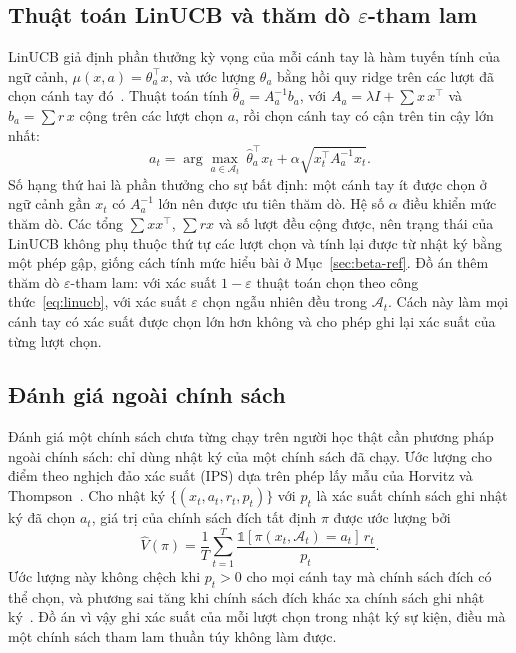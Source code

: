 \subsection{Thuật toán LinUCB và thăm dò $\varepsilon$-tham lam}
LinUCB giả định phần thưởng kỳ vọng của mỗi cánh tay là hàm tuyến tính của ngữ cảnh, $\mu(x,a)=\theta_a^{\top}x$, và ước lượng $\theta_a$ bằng hồi quy ridge trên các lượt đã chọn cánh tay đó~\cite{li2010linucb}. Thuật toán tính $\hat\theta_a=A_a^{-1}b_a$, với $A_a=\lambda I+\sum x\,x^{\top}$ và $b_a=\sum r\,x$ cộng trên các lượt chọn $a$, rồi chọn cánh tay có cận trên tin cậy lớn nhất:
\begin{equation}
a_t=\arg\max_{a\in\mathcal{A}_t}\ \hat\theta_a^{\top}x_t+\alpha\sqrt{x_t^{\top}A_a^{-1}x_t}.
\label{eq:linucb}
\end{equation}
Số hạng thứ hai là phần thưởng cho sự bất định: một cánh tay ít được chọn ở ngữ cảnh gần $x_t$ có $A_a^{-1}$ lớn nên được ưu tiên thăm dò. Hệ số $\alpha$ điều khiển mức thăm dò. Các tổng $\sum xx^{\top}$, $\sum rx$ và số lượt đều cộng được, nên trạng thái của LinUCB không phụ thuộc thứ tự các lượt chọn và tính lại được từ nhật ký bằng một phép gập, giống cách tính mức hiểu bài ở Mục~\ref{sec:beta-ref}. Đồ án thêm thăm dò $\varepsilon$-tham lam: với xác suất $1-\varepsilon$ thuật toán chọn theo công thức~\eqref{eq:linucb}, với xác suất $\varepsilon$ chọn ngẫu nhiên đều trong $\mathcal{A}_t$. Cách này làm mọi cánh tay có xác suất được chọn lớn hơn không và cho phép ghi lại xác suất của từng lượt chọn.

\subsection{Đánh giá ngoài chính sách}
Đánh giá một chính sách chưa từng chạy trên người học thật cần phương pháp ngoài chính sách: chỉ dùng nhật ký của một chính sách đã chạy. Ước lượng cho điểm theo nghịch đảo xác suất (IPS) dựa trên phép lấy mẫu của Horvitz và Thompson~\cite{horvitz1952}. Cho nhật ký $\{(x_t,a_t,r_t,p_t)\}$ với $p_t$ là xác suất chính sách ghi nhật ký đã chọn $a_t$, giá trị của chính sách đích tất định $\pi$ được ước lượng bởi
\begin{equation}
\hat V(\pi)=\frac{1}{T}\sum_{t=1}^{T}\frac{\mathbb{1}[\pi(x_t,\mathcal{A}_t)=a_t]\,r_t}{p_t}.
\label{eq:ips}
\end{equation}
Ước lượng này không chệch khi $p_t>0$ cho mọi cánh tay mà chính sách đích có thể chọn, và phương sai tăng khi chính sách đích khác xa chính sách ghi nhật ký~\cite{li2011replay}. Đồ án vì vậy ghi xác suất của mỗi lượt chọn trong nhật ký sự kiện, điều mà một chính sách tham lam thuần túy không làm được.
